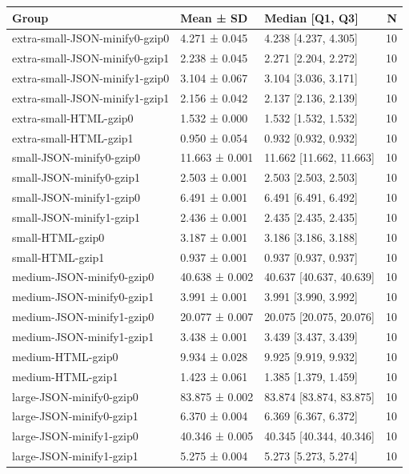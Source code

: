 \begin{tabular}{lllr}
\toprule
Group & Mean ± SD & Median [Q1, Q3] & N \\
\midrule
extra-small-JSON-minify0-gzip0 & 4.271 ± 0.045 & 4.238 [4.237, 4.305] & 10 \\
extra-small-JSON-minify0-gzip1 & 2.238 ± 0.045 & 2.271 [2.204, 2.272] & 10 \\
extra-small-JSON-minify1-gzip0 & 3.104 ± 0.067 & 3.104 [3.036, 3.171] & 10 \\
extra-small-JSON-minify1-gzip1 & 2.156 ± 0.042 & 2.137 [2.136, 2.139] & 10 \\
extra-small-HTML-gzip0 & 1.532 ± 0.000 & 1.532 [1.532, 1.532] & 10 \\
extra-small-HTML-gzip1 & 0.950 ± 0.054 & 0.932 [0.932, 0.932] & 10 \\
small-JSON-minify0-gzip0 & 11.663 ± 0.001 & 11.662 [11.662, 11.663] & 10 \\
small-JSON-minify0-gzip1 & 2.503 ± 0.001 & 2.503 [2.503, 2.503] & 10 \\
small-JSON-minify1-gzip0 & 6.491 ± 0.001 & 6.491 [6.491, 6.492] & 10 \\
small-JSON-minify1-gzip1 & 2.436 ± 0.001 & 2.435 [2.435, 2.435] & 10 \\
small-HTML-gzip0 & 3.187 ± 0.001 & 3.186 [3.186, 3.188] & 10 \\
small-HTML-gzip1 & 0.937 ± 0.001 & 0.937 [0.937, 0.937] & 10 \\
medium-JSON-minify0-gzip0 & 40.638 ± 0.002 & 40.637 [40.637, 40.639] & 10 \\
medium-JSON-minify0-gzip1 & 3.991 ± 0.001 & 3.991 [3.990, 3.992] & 10 \\
medium-JSON-minify1-gzip0 & 20.077 ± 0.007 & 20.075 [20.075, 20.076] & 10 \\
medium-JSON-minify1-gzip1 & 3.438 ± 0.001 & 3.439 [3.437, 3.439] & 10 \\
medium-HTML-gzip0 & 9.934 ± 0.028 & 9.925 [9.919, 9.932] & 10 \\
medium-HTML-gzip1 & 1.423 ± 0.061 & 1.385 [1.379, 1.459] & 10 \\
large-JSON-minify0-gzip0 & 83.875 ± 0.002 & 83.874 [83.874, 83.875] & 10 \\
large-JSON-minify0-gzip1 & 6.370 ± 0.004 & 6.369 [6.367, 6.372] & 10 \\
large-JSON-minify1-gzip0 & 40.346 ± 0.005 & 40.345 [40.344, 40.346] & 10 \\
large-JSON-minify1-gzip1 & 5.275 ± 0.004 & 5.273 [5.273, 5.274] & 10 \\

\end{tabular}
